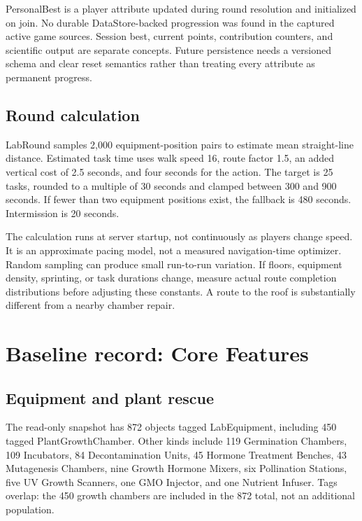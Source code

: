 PersonalBest is a player attribute updated during round resolution and initialized on join.\allowbreak{} No durable DataStore-backed progression was found in the captured active game sources.\allowbreak{} Session best, current points, contribution counters, and scientific output are separate concepts.\allowbreak{} Future persistence needs a versioned schema and clear reset semantics rather than treating every attribute as permanent progress.\allowbreak{}

\section{Round calculation}
LabRound samples 2,000 equipment-position pairs to estimate mean straight-line distance.\allowbreak{} Estimated task time uses walk speed 16, route factor 1.\allowbreak{}5, an added vertical cost of 2.\allowbreak{}5 seconds, and four seconds for the action.\allowbreak{} The target is 25 tasks, rounded to a multiple of 30 seconds and clamped between 300 and 900 seconds.\allowbreak{} If fewer than two equipment positions exist, the fallback is 480 seconds.\allowbreak{} Intermission is 20 seconds.\allowbreak{}

The calculation runs at server startup, not continuously as players change speed.\allowbreak{} It is an approximate pacing model, not a measured navigation-time optimizer.\allowbreak{} Random sampling can produce small run-to-run variation.\allowbreak{} If floors, equipment density, sprinting, or task durations change, measure actual route completion distributions before adjusting these constants.\allowbreak{} A route to the roof is substantially different from a nearby chamber repair.\allowbreak{}

\chapter{Baseline record: Core Features}
\section{Equipment and plant rescue}
The read-only snapshot has 872 objects tagged LabEquipment, including 450 tagged PlantGrowthChamber.\allowbreak{} Other kinds include 119 Germination Chambers, 109 Incubators, 84 Decontamination Units, 45 Hormone Treatment Benches, 43 Mutagenesis Chambers, nine Growth Hormone Mixers, six Pollination Stations, five UV Growth Scanners, one GMO Injector, and one Nutrient Infuser.\allowbreak{} Tags overlap: the 450 growth chambers are included in the 872 total, not an additional population.\allowbreak{}

